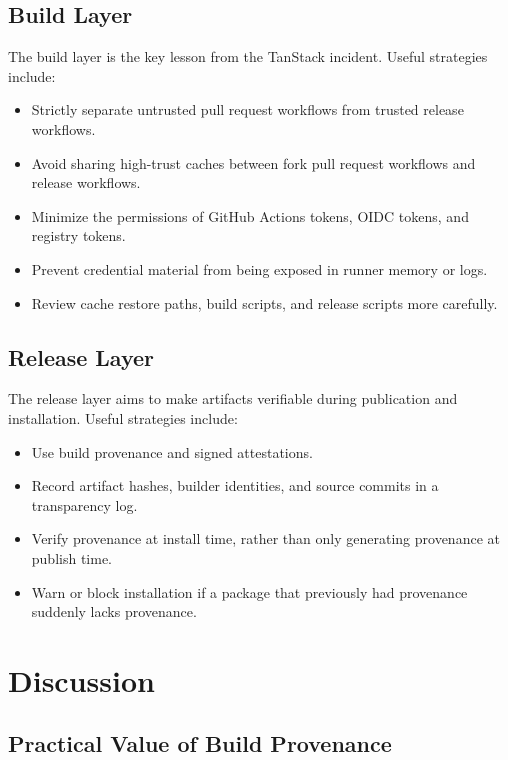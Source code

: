 \documentclass[12pt,a4paper]{article}
\begin{document}
\subsection{Build Layer}

The build layer is the key lesson from the TanStack incident. Useful strategies include:

\begin{itemize}
  \item Strictly separate untrusted pull request workflows from trusted release workflows.
  \item Avoid sharing high-trust caches between fork pull request workflows and release workflows.
  \item Minimize the permissions of GitHub Actions tokens, OIDC tokens, and registry tokens.
  \item Prevent credential material from being exposed in runner memory or logs.
  \item Review cache restore paths, build scripts, and release scripts more carefully.
\end{itemize}

\subsection{Release Layer}

The release layer aims to make artifacts verifiable during publication and installation. Useful strategies include:

\begin{itemize}
  \item Use build provenance and signed attestations.
  \item Record artifact hashes, builder identities, and source commits in a transparency log.
  \item Verify provenance at install time, rather than only generating provenance at publish time.
  \item Warn or block installation if a package that previously had provenance suddenly lacks provenance.
\end{itemize}

\section{Discussion}

\subsection{Practical Value of Build Provenance}
\end{document}

